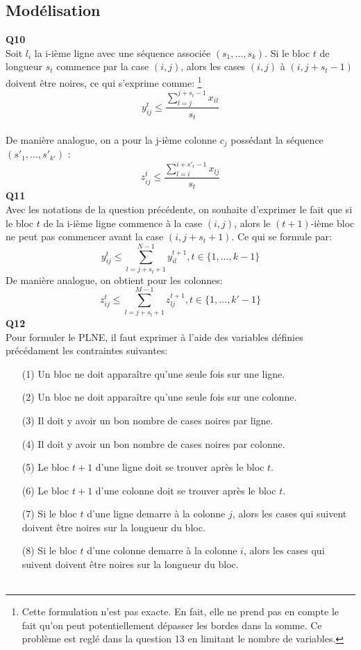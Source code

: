 \documentclass[10pt,a4paper]{article}
\begin{document}
\subsection{Modélisation}
\noindent
\textbf{Q10} \\
\noindent
Soit $l_i$ la i-ième ligne avec une séquence associée $(s_1, \hdots ,s_k)$. Si le bloc $t$ de longueur $s_t$ commence par la case $(i,j)$, alors les cases $(i,j)$ à $(i,j+s_t-1)$ doivent être noires, ce qui s'exprime comme: \footnote{Cette formulation n'est pas exacte. En fait, elle ne prend pas en compte le fait qu'on peut potentiellement dépasser les bordes dans la somme. Ce problème est reglé dans la question 13 en limitant le nombre de variables.} 
 $$ y_{ij}^{t} \leq \frac{\sum_{l = j}^{j+s_t-1} x_{il}}{s_t}$$\\ 
\noindent
De manière analogue, on a pour la j-ième colonne $c_j$ possédant la séquence $(s'_{1}, \hdots , s'_{k'})$ : 
$$ z_{ij}^{t} \leq \frac{\sum_{l = i}^{i+s'_t-1} x_{lj}}{s_t}$$
\textbf{Q11} \\
Avec les notations de la question précédente, on souhaite d'exprimer le fait que si le bloc $t$ de la i-ième ligne commence à la case $(i,j)$, alors le $(t+1)$-ième bloc ne peut pas commencer avant la case $(i, j+ s_t +1)$. Ce qui se formule par: 
$$ y_{ij}^t \leq \sum_{l = j+s_t+1}^{N-1} y_{il}^{t+1} , t \in \lbrace 1, \hdots, k-1 \rbrace$$
\noindent
De manière analogue, on obtient pour les colonnes: 
$$ z_{ij}^t \leq \sum_{l = j+s_t+1}^{M-1} z_{lj}^{t+1} , t \in \lbrace 1, \hdots, k'-1 \rbrace$$
\textbf{Q12} \\ 
\noindent
Pour formuler le PLNE, il faut exprimer à l'aide des variables définies précédament les contraintes suivantes: \\
\begin{itemize}
\item[(1)] Un bloc ne doit apparaître qu'une seule fois sur une ligne.
\item[(2)] Un bloc ne doit apparaître qu'une seule fois sur une colonne.
\item[(3)] Il doit y avoir un bon nombre de cases noires par ligne.
\item[(4)] Il doit y avoir un bon nombre de cases noires par colonne.
\item[(5)] Le bloc $t+1$ d'une ligne doit se trouver après le bloc $t$.
\item[(6)] Le bloc $t+1$ d'une colonne doit se trouver après le bloc $t$.
\item[(7)] Si le bloc $t$ d'une ligne demarre à la colonne $j$, alors les cases qui suivent doivent être noires sur la longueur du bloc.
\item[(8)] Si le bloc $t$ d'une colonne demarre à la colonne $i$, alors les cases qui suivent doivent être noires sur la longueur du bloc. \\ \\    
\end{itemize} 
\end{document}
